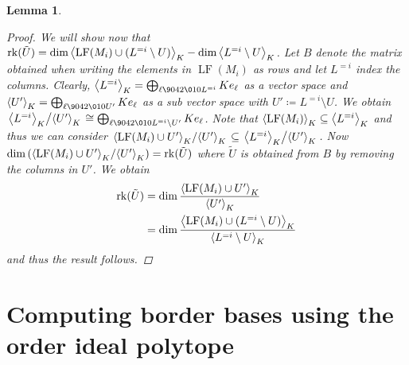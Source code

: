 \documentclass[11pt,oneside,english]{amsart}
\makeatletter
\numberwithin{equation}{section}
\numberwithin{figure}{section}
\theoremstyle{plain}
\theoremstyle{definition}
\theoremstyle{definition}
\theoremstyle{remark}
\theoremstyle{plain}
\newtheorem{lem}[thm]{Lemma}
\theoremstyle{plain}
\theoremstyle{plain}
\theoremstyle{problem@}
\makeatother
\begin{document}
\begin{lem}
\begin{proof}
We will show now that ${\operatorname{rk}({\tilde{U}})}=\dim{{\left\langle {\operatorname{LF}(M_{i})\cup(L^{=i}\setminus U)}\right\rangle}\sb{K}}-\dim{{\left\langle {L^{=i}\setminus U}\right\rangle}\sb{K}}$.
Let $B$ denote the matrix obtained when writing the elements in $\operatorname{LF}(M_{i})$
as rows and let $L^{=i}$ index the columns. Clearly, ${{\left\langle {L^{=i}}\right\rangle}\sb{K}}=\bigoplus_{\ell{\9042\010} L^{=i}}Ke_{\ell}$
as a vector space and ${{\left\langle {U'}\right\rangle}\sb{K}}=\bigoplus_{\ell{\9042\010} U'} Ke_{\ell}$
as a sub vector space with $U'\coloneqq L^{=i}\setminus U$. We obtain
$\left. {{\left\langle {L^{=i}}\right\rangle}\sb{K}} \middle/ {{\left\langle {U'}\right\rangle}\sb{K}} \right. \cong \bigoplus_{\ell{\9042\010}
    L^{=i}\setminus U'} Ke_{\ell}$.
Note that ${{\left\langle {\operatorname{LF}(M_{i})}\right\rangle}\sb{K}}\subseteq{{\left\langle {L^{=i}}\right\rangle}\sb{K}}$ and thus we can
consider $\left. {{\left\langle {\operatorname{LF}(M_{i})\cup U'}\right\rangle}\sb{K}} \middle/
  {{\left\langle {U'}\right\rangle}\sb{K}} \right. \subseteq \left. {{\left\langle {L^{=i}}\right\rangle}\sb{K}} \middle/ {{\left\langle {U'}\right\rangle}\sb{K}} \right.$.
Now $\dim \left( {{\left\langle {\operatorname{LF}(M_{i})\cup U'}\right\rangle}\sb{K}} \middle/ {{\left\langle {U'}\right\rangle}\sb{K}} \right) =
{\operatorname{rk}({\tilde{U}})}$ where
$\tilde{U}$ is obtained from $B$ by removing the columns in $U'$.
We obtain
\begin{equation*}
  \begin{split}
    {\operatorname{rk}({\tilde{U}})} &= \dim\frac{{{\left\langle {\operatorname{LF}(M_{i})\cup U'}\right\rangle}\sb{K}}}{{{\left\langle {U'}\right\rangle}\sb{K}}}\\
    &= \dim\frac{{{\left\langle {\operatorname{LF}(M_{i})\cup(L^{=i}\setminus
        U)}\right\rangle}\sb{K}}}{{{\left\langle {L^{=i}\setminus U}\right\rangle}\sb{K}}}
  \end{split}
\end{equation*}
and thus the result follows.
\end{proof}
\end{lem}

\section{\label{sec:Computing-border-bases}Computing border bases using the
order ideal polytope}
\end{document}

